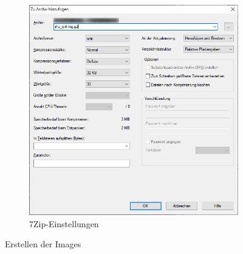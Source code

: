 \begin{figure}[H]
\begin{subfigure}[b]{0.5\linewidth}
        \includegraphics[width=1\textwidth]{img/pi_img_7zip.png}
        \caption[7Zip-Einstellungen]{7Zip-Einstellungen}
        \label{fig:create_image_05}
    \end{subfigure}
    \caption[Erstellen der Images]{Erstellen der Images}
    \label{fig:create_image}
\end{figure}
